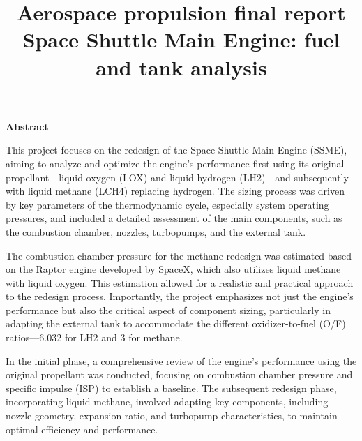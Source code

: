 
\usepackage[a4paper,top=2cm,bottom=2cm,left=2cm,right=2cm]{geometry}
\graphicspath{ {./figures/} }

\title{ \textbf{Aerospace propulsion final report
\\ Space Shuttle Main Engine: fuel and tank analysis}}

    \maketitle
    \newpage
    \textbf{Abstract}
     
     This project focuses on the redesign of the Space Shuttle Main Engine (SSME), aiming to analyze and optimize the engine's performance first using its original propellant—liquid oxygen (LOX) and liquid hydrogen (LH2)—and subsequently with liquid methane (LCH4) replacing hydrogen. The sizing process was driven by key parameters of the thermodynamic cycle, especially system operating pressures, and included a detailed assessment of the main components, such as the combustion chamber, nozzles, turbopumps, and the external tank.

   The combustion chamber pressure for the methane redesign was estimated based on the Raptor engine developed by SpaceX, which also utilizes liquid methane with liquid oxygen. This estimation allowed for a realistic and practical approach to the redesign process. Importantly, the project emphasizes not just the engine's performance but also the critical aspect of component sizing, particularly in adapting the external tank to accommodate the different oxidizer-to-fuel (O/F) ratios—6.032 for LH2 and 3 for methane.

   In the initial phase, a comprehensive review of the engine's performance using the original propellant was conducted, focusing on combustion chamber pressure and specific impulse (ISP) to establish a baseline. The subsequent redesign phase, incorporating liquid methane, involved adapting key components, including nozzle geometry, expansion ratio, and turbopump characteristics, to maintain optimal efficiency and performance.

